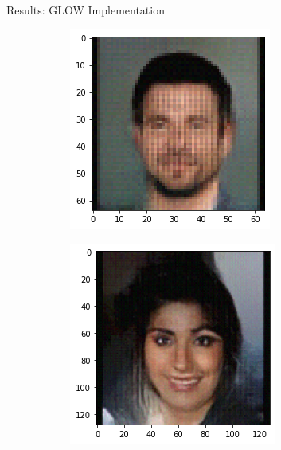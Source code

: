 \begin{frame}{Results: GLOW Implementation}
\begin{figure}[htbp!]
\begin{subfigure}[b]{0.3\textwidth}
     \end{subfigure}
     \hfill
     \begin{subfigure}[b]{0.3\textwidth}
         \centering
         \includegraphics[width=\textwidth]{Images/celeb_sample3.png}
     \end{subfigure}
     \hfill
     \begin{subfigure}[b]{0.3\textwidth}
         \centering
         \includegraphics[width=\textwidth]{Images/celeb_sample4.png}

\end{subfigure}
\end{figure}
\end{frame}
